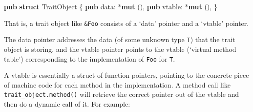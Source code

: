 \documentclass[a4paper,]{book}
\newenvironment{Shaded}{\begin{snugshade}}{\end{snugshade}}
\newcommand{\KeywordTok}[1]{\textcolor[rgb]{0.13,0.29,0.53}{\textbf{{#1}}}}
\newcommand{\NormalTok}[1]{{#1}}
\begin{document}
\begin{Shaded}
\begin{Highlighting}[]
\KeywordTok{pub} \KeywordTok{struct} \NormalTok{TraitObject \{}
    \KeywordTok{pub} \NormalTok{data: *}\KeywordTok{mut} \NormalTok{(),}
    \KeywordTok{pub} \NormalTok{vtable: *}\KeywordTok{mut} \NormalTok{(),}
\NormalTok{\}}
\end{Highlighting}
\end{Shaded}

That is, a trait object like \texttt{\&Foo} consists of a `data' pointer
and a `vtable' pointer.

The data pointer addresses the data (of some unknown type \texttt{T})
that the trait object is storing, and the vtable pointer points to the
vtable (`virtual method table') corresponding to the implementation of
\texttt{Foo} for \texttt{T}.

A vtable is essentially a struct of function pointers, pointing to the
concrete piece of machine code for each method in the implementation. A
method call like \texttt{trait\_object.method()} will retrieve the
correct pointer out of the vtable and then do a dynamic call of it. For
example:
\end{document}
